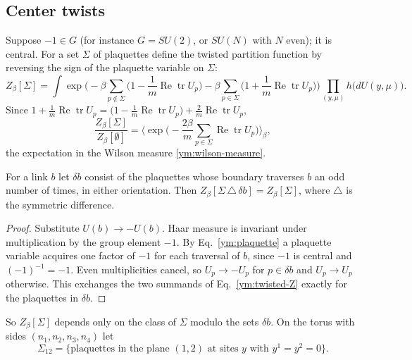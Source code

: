 \subsection{Center twists}
Suppose $-1\in G$ (for instance $G=SU(2)$, or $SU(N)$ with $N$ even); it is
central. For a set $\Sigma$ of plaquettes define the twisted partition
function by reversing the sign of the plaquette variable on $\Sigma$:
\begin{equation}\label{ym:twisted-Z}
 Z_\beta[\Sigma]=\int\exp\Big(-\beta\sum_{p\notin\Sigma}
 \Big(1-\frac1m\operatorname{Re}\operatorname{tr}U_p\Big)
 -\beta\sum_{p\in\Sigma}
 \Big(1+\frac1m\operatorname{Re}\operatorname{tr}U_p\Big)\Big)
 \prod_{(y,\mu)}h\big(dU(y,\mu)\big).
\end{equation}
Since $1+\frac1m\operatorname{Re}\operatorname{tr}U_p
=\big(1-\frac1m\operatorname{Re}\operatorname{tr}U_p\big)
+\frac2m\operatorname{Re}\operatorname{tr}U_p$,
\begin{equation}\label{ym:twist-ratio}
 \frac{Z_\beta[\Sigma]}{Z_\beta[\emptyset]}
 =\Big\langle\exp\Big(-\frac{2\beta}{m}\sum_{p\in\Sigma}
 \operatorname{Re}\operatorname{tr}U_p\Big)\Big\rangle_{\beta},
\end{equation}
the expectation in the Wilson measure \eqref{ym:wilson-measure}.
\begin{lemma}\label{ym:lem:twist-move}
For a link $b$ let $\delta b$ consist of the plaquettes whose boundary
traverses $b$ an odd number of times, in either orientation. Then
$Z_\beta[\Sigma\,\triangle\,\delta b]=Z_\beta[\Sigma]$, where $\triangle$ is
the symmetric difference.
\end{lemma}
\begin{proof}
Substitute $U(b)\to-U(b)$. Haar measure is invariant under multiplication by
the group element $-1$. By Eq.~\eqref{ym:plaquette} a plaquette variable
acquires one factor of $-1$ for each traversal of $b$, since $-1$ is
central and $(-1)^{-1}=-1$. Even multiplicities cancel, so $U_p\to-U_p$ for
$p\in\delta b$ and $U_p\to U_p$ otherwise. This exchanges the two summands of
Eq.~\eqref{ym:twisted-Z} exactly for the plaquettes in $\delta b$.
\end{proof}
So $Z_\beta[\Sigma]$ depends only on the class of $\Sigma$ modulo the sets
$\delta b$. On the torus with sides $(n_1,n_2,n_3,n_4)$ let
\begin{equation}\label{ym:thooft-surface}
 \Sigma_{12}=\{\text{plaquettes in the plane }(1,2)\text{ at sites }y
 \text{ with }y^1=y^2=0\}.
\end{equation}
